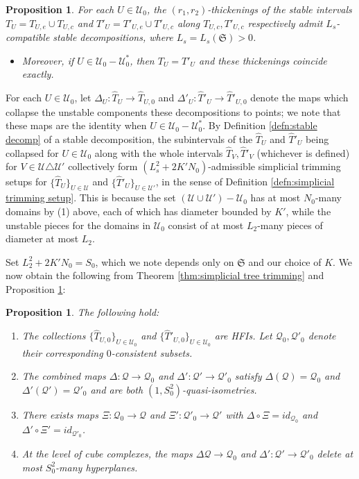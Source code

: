 \documentclass{amsart}
\newtheorem{proposition}[theorem]{Proposition}
\theoremstyle{definition}
\theoremstyle{remark}
\theoremstyle{definition}
\newcommand{\calQ}{\mathcal{Q}}
\newcommand{\calU}{\mathcal{U}}
\newcommand{\hT}{\widehat{T}}
\begin{document}
\begin{proposition}\label{prop:stable interval decomp}
For each $U \in \calU_0$, the $(r_1,r_2)$-thickenings of the stable intervals $T_U = T_{U,e} \cup T_{U,c}$ and $T'_U = T'_{U,e} \cup T'_{U,c}$ along $T_{U,c}, T'_{U,c}$ respectively admit $L_s$-compatible stable decompositions, where $L_s = L_s(\mathfrak S)>0$.
\begin{itemize}
\item Moreover, if $U \in \calU_0 - \calU^*_0$, then $T_U = T'_U$ and these thickenings coincide exactly.
\end{itemize}
\end{proposition}

For each $U \in \calU_0$, let $\Delta_U:\hT_U \to \hT_{U,0}$ and $\Delta'_U:\hT'_U \to \hT'_{U,0}$ denote the maps which collapse the unstable components these decompositions to points; we note that these maps are the identity when $U \in \calU_0- \calU^*_0$.  By Definition \ref{defn:stable decomp} of a stable decomposition, the subintervals of the $\hT_U$ and $\hT'_U$ being collapsed for $U \in \calU_0$ along with the whole intervals $\hT_V, \hT'_V$ (whichever is defined) for $V \in \calU \triangle \calU'$ collectively form $(L_s^2+2K'N_0)$-admissible simplicial trimming setups for $\{\hT_U\}_{U \in \calU}$ and $\{\hT'_U\}_{U \in \calU'}$, in the sense of Definition \ref{defn:simplicial trimming setup}.  This is because the set $(\calU \cup \calU') - \calU_0$ has at most $N_0$-many domains by (1) above, each of which has diameter bounded by $K'$, while the unstable pieces for the domains in $\calU_0$ consist of at most $L_2$-many pieces of diameter at most $L_2$.

Set $L_2^2 + 2K'N_0 = S_0$, which we note depends only on $\mathfrak S$ and our choice of $K$.  We now obtain the following from Theorem \ref{thm:simplicial tree trimming} and Proposition \ref{prop:stable interval decomp}:

\begin{proposition} \label{prop:stable collapse}
The following hold:
\begin{enumerate}
\item The collections $\{\hT_{U,0}\}_{U \in \calU_0}$ and $\{\hT'_{U,0}\}_{U \in \calU_0}$ are HFIs.  Let $\calQ_0, \calQ'_0$ denote their corresponding $0$-consistent subsets.
\item The combined maps $\Delta:\calQ \to \calQ_0$ and $\Delta':\calQ' \to \calQ'_0$ satisfy $\Delta(\calQ) = \calQ_0$ and $\Delta'(\calQ') = \calQ'_0$ and are both $(1, S_0^2)$-quasi-isometries.
\item There exists maps $\Xi:\calQ_0 \to \calQ$ and $\Xi':\calQ'_0 \to \calQ'$ with $\Delta \circ \Xi = id_{\calQ_0}$ and $\Delta' \circ \Xi' = id_{\calQ'_0}$.
\item At the level of cube complexes, the maps $\Delta\calQ \to \calQ_0$ and $\Delta':\calQ' \to \calQ'_0$ delete at most $S_0^2$-many hyperplanes.
\end{enumerate}
\end{proposition}
\end{document}
